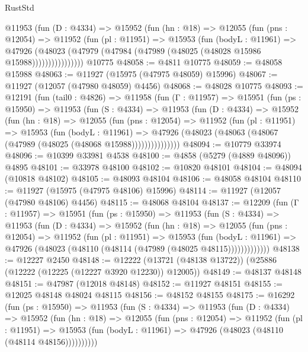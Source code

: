 \begin{lexlean}{RustStd}
\begin{coremodule}
            @11953
              (fun (D : @4334) =>
              @15952
                (fun (hn : @18) =>
                @12055
                  (fun (pns : @12054) =>
                  @11952
                    (fun (pl : @11951) =>
                    @15953
                      (fun (bodyL : @11961) =>
                      @47926
                        (@48023
                          (@47979 (@47984 (@47989 (@48025 (@48028 @15986 @15988))))))))))))))))
    @10775
@48058 := @4811 @10775
@48059 := @48058 @15988
@48063 := @11927 (@15975 (@47975 @48059) @15996)
@48067 := @11927 (@12057 (@47980 @48059) @4456)
@48068 := @48028 @10775
@48093 := @12191
    (fun (tail0 : @4826) =>
    @11958
      (fun (Γ : @11957) =>
      @15951
        (fun (ps : @15950) =>
        @11953
          (fun (S : @4334) =>
          @11953
            (fun (D : @4334) =>
            @15952
              (fun (hn : @18) =>
              @12055
                (fun (pns : @12054) =>
                @11952
                  (fun (pl : @11951) =>
                  @15953
                    (fun (bodyL : @11961) =>
                    @47926 (@48023 (@48063 (@48067 (@47989 (@48025 (@48068 @15988)))))))))))))))
@48094 := @10779 @33974
@48096 := @10399 @33981 @4538
@48100 := @4858 (@5279 (@4889 @48096)) @4895
@48101 := @33978 @48100
@48102 := @10820 @48101
@48104 := @48094 (@10818 @48102)
@48105 := @48093 @48104
@48106 := @48058 @48104
@48110 := @11927 (@15975 (@47975 @48106) @15996)
@48114 := @11927 (@12057 (@47980 @48106) @4456)
@48115 := @48068 @48104
@48137 := @12209
    (fun (Γ : @11957) =>
    @15951
      (fun (ps : @15950) =>
      @11953
        (fun (S : @4334) =>
        @11953
          (fun (D : @4334) =>
          @15952
            (fun (hn : @18) =>
            @12055
              (fun (pns : @12054) =>
              @11952
                (fun (pl : @11951) =>
                @15953
                  (fun (bodyL : @11961) =>
                  @47926 (@48023 (@48110 (@48114 (@47989 (@48025 @48115)))))))))))))
@48138 := @12227 @2450
@48148 := @12222 (@13721 (@48138 @13722)) (@25886 (@12222 (@12225 (@12227 @3920 @12230)) @12005))
@48149 := @48137 @48148
@48151 := @47987 (@12018 @48148)
@48152 := @11927 @48151
@48155 := @12025 @48148 @48024 @48115
@48156 := @48152 @48155
@48175 := @16292
    (fun (ps : @15950) =>
    @11953
      (fun (S : @4334) =>
      @11953
        (fun (D : @4334) =>
        @15952
          (fun (hn : @18) =>
          @12055
            (fun (pns : @12054) =>
            @11952
              (fun (pl : @11951) =>
              @15953 (fun (bodyL : @11961) => @47926 (@48023 (@48110 (@48114 @48156))))))))))

\end{coremodule}
\end{lexlean}
